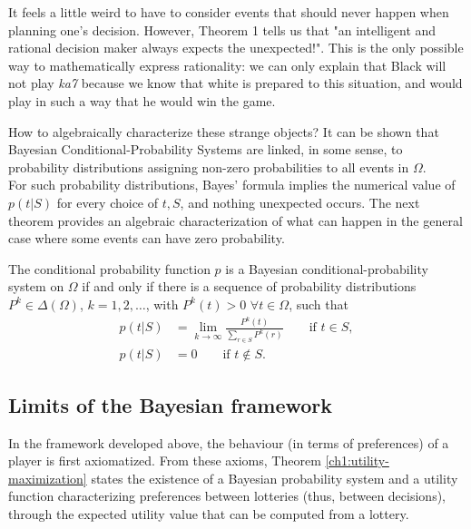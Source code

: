 It feels a little weird to have to consider events that should never happen when planning one's decision. However, Theorem 1 tells us that "an intelligent and rational decision maker always expects the unexpected!".
This is the only possible way to mathematically express rationality: we can only explain that Black will not play \emph{ka7} because we know that white is prepared to this situation, and would play in such a way that he would win the game.

How to algebraically characterize these strange objects? It can be shown that Bayesian Conditional-Probability Systems are linked, in some sense, to probability distributions assigning non-zero probabilities to all events in $\Omega$. \\
For such probability distributions, Bayes' formula implies the numerical value of $p(t|S)$ for every choice of $t,S$, and nothing unexpected occurs.  The next theorem provides an algebraic characterization of what can happen in the general case where some events can have zero probability.

\begin{theorem}
The conditional probability function $p$ is a Bayesian conditional-probability system on $\Omega$ if and only if there is a sequence of probability distributions $P^k \in \Delta(\Omega)$, $k = 1, 2, \ldots$, with $P^k(t) > 0$ $\forall t \in \Omega$, such that
\begin{equation}
\begin{aligned}
p(t|S) & = \lim_{k \rightarrow \infty} \frac{P^k(t)}{\sum_{r \in S} P^k(r)} \qquad \text{if $t \in S$},\\
p(t|S) & = 0  \qquad \text{if $t \not \in S$}.
\end{aligned}
\end{equation} 
\end{theorem}

\subsection{Limits of the Bayesian framework}

In the framework developed above, the behaviour (in terms of preferences) of a player is first axiomatized. From these axioms, Theorem \ref{ch1:utility-maximization} states the existence of a Bayesian probability system and a utility function characterizing preferences between lotteries (thus, between decisions), through the expected utility value that can be computed from a lottery.

